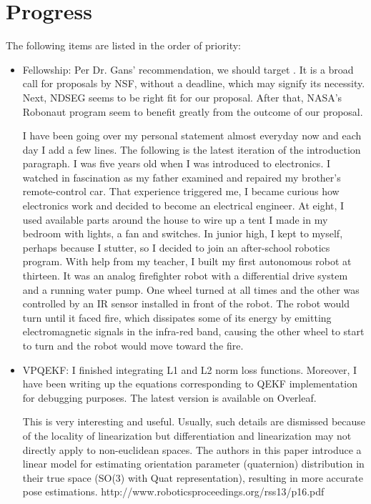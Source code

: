 \documentclass[11pt]{article}
\begin{document}
\section{Progress}
The following items are listed in the order of priority:
\begin{itemize}
      \item Fellowship:  Per Dr. Gans' recommendation, we should target \cite{AM_Opt}. It is a
      broad call for proposals by NSF, without a deadline, which may signify its necessity. Next, NDSEG \cite{NDSEG27}
      seems to be right fit for our proposal. After that, NASA's Robonaut program \cite{Robonaut95:online} seem to benefit
      greatly from the outcome of our proposal.

      I have been going over my personal statement almost everyday now and
      each day I add a few lines. The following is the latest iteration of the introduction
      paragraph. I was five years old when I was introduced to electronics.
      I watched in fascination as my father examined and repaired my brother's
      remote-control car. That experience triggered me, I became curious how electronics
      work and decided to become an electrical engineer.
      At eight, I used available
      parts around the house to wire up a tent I made in my bedroom with lights, a fan
      and switches. In junior high, I kept to myself, perhaps because I
      stutter, so I decided to join an after-school robotics program. With help from my
      teacher, I built my first autonomous robot at thirteen. It was an analog firefighter
      robot with a differential drive system and a running water pump. One wheel turned at all times
      and the other was controlled by an IR sensor installed in front of the robot. The
      robot would turn until it faced fire, which dissipates some of its energy by
      emitting electromagnetic signals in the infra-red band, causing the other
      wheel to start to turn and the robot would
      move toward the fire.
      \item VPQEKF: I finished integrating L1 and L2 norm loss functions. Moreover, I
      have been writing up the equations corresponding to QEKF implementation
      for debugging purposes. The latest version is available on Overleaf.




      This is very interesting and useful. Usually, such details are dismissed because of the locality of linearization but differentiation and linearization may not directly apply to non-euclidean spaces. The authors in this paper introduce a linear model for estimating orientation parameter (quaternion) distribution in their true space (SO(3) with Quat representation), resulting in more accurate pose estimations.
      http://www.roboticsproceedings.org/rss13/p16.pdf


\end{itemize}
\end{document}
